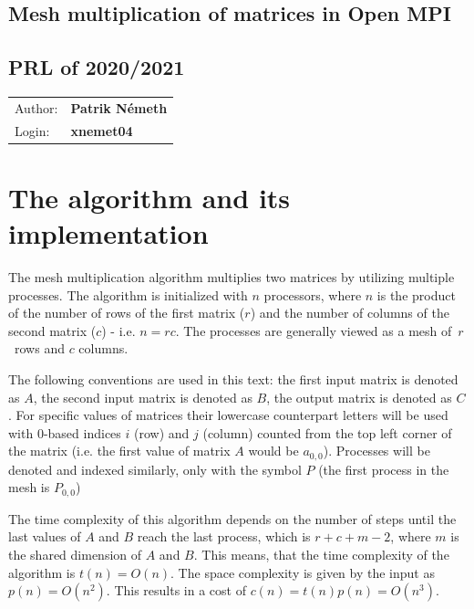\documentclass[pdftex, 11pt, a4paper, titlepage]{article}
\begin{document}
    \begin{center}
        \section*{Mesh multiplication of matrices in Open MPI}
        \subsection*{PRL of 2020/2021}
        \begin{tabular}{ l l }
            Author: & \textbf{Patrik Németh} \\
            Login: & \textbf{xnemet04}
        \end{tabular}
    \end{center}

    \section{The algorithm and its implementation}
    The mesh multiplication algorithm multiplies two matrices by utilizing multiple
    processes.
    The algorithm is initialized with $n$ processors, where $n$ is the product of
    the number of rows of the first matrix ($r$) and the number of columns of the
    second matrix ($c$) - i.e. $n = rc$. The processes are generally viewed as
    a mesh of~$r$~rows and $c$ columns.

    The following conventions are used in this text: the first input matrix is
    denoted as $A$, the second input matrix is denoted as $B$, the output matrix
    is denoted as $C$. For specific values of matrices their lowercase counterpart
    letters will be used with $0$-based indices $i$ (row) and $j$ (column) counted
    from the top left corner of the matrix (i.e. the first value of matrix $A$ would
    be $a_{0,0}$). Processes will be denoted and indexed similarly, only with the
    symbol $P$ (the first process in the mesh is $P_{0,0}$)

    The time complexity of this algorithm depends on the number of steps until
    the last values of $A$ and $B$ reach the last process, which is $r + c + m - 2$,
    where $m$ is the shared dimension of $A$ and $B$. This means, that the time
    complexity of the algorithm is $t(n) = O(n)$. The space complexity is given by
    the input as $p(n) = O(n^2)$. This results in a cost of $c(n) = t(n)p(n) = O(n^3)$.
\end{document}
